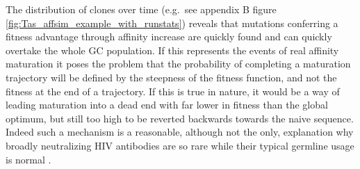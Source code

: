 

The distribution of clones over time (e.g.\ see appendix B figure \ref{fig:Tas_affsim_example_with_runstats}) reveals that mutations conferring a fitness advantage through affinity increase are quickly found and can quickly overtake the whole GC population.
If this represents the events of real affinity maturation it poses the problem that the probability of completing a maturation trajectory will be defined by the steepness of the fitness function, and not the fitness at the end of a trajectory.
If this is true in nature, it would be a way of leading maturation into a dead end with far lower in fitness than the global optimum, but still too high to be reverted backwards towards the naive sequence.
Indeed such a mechanism is a reasonable, although not the only, explanation why broadly neutralizing HIV antibodies are so rare while their typical germline usage is normal \cite{scheepers2015ability}.


